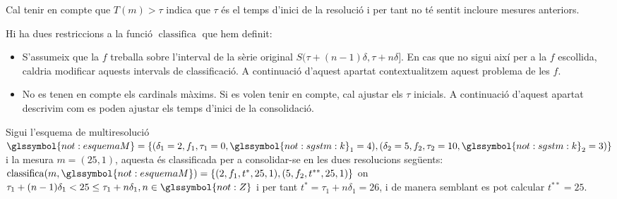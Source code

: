 Cal tenir en compte que $T(m) > \tau$ indica que $\tau$ és el temps
d'inici de la resolució i per tant no té sentit incloure mesures
anteriors.





Hi ha dues restriccions a la funció $\operatorname{classifica}$ que
hem definit: 
\begin{itemize}

\item S'assumeix que la $f$ treballa sobre l'interval de la sèrie
  original $S(\tau+(n-1)\delta ,\tau+n\delta]$. En cas que no sigui
  així per a la $f$ escollida, caldria modificar aquests intervals de
  classificació. A continuació d'aquest apartat contextualitzem aquest
  problema de les $f$.

\item No es tenen en compte els cardinals màxims. Si es volen tenir en
  compte, cal ajustar els $\tau$ inicials. A continuació d'aquest
  apartat descrivim com es poden ajustar els temps d'inici de la
  consolidació.

\end{itemize}



\begin{example}
  \label{ex:mapreduce:classifica}
  Sigui l'esquema de multiresolució
  $\glssymbol{not:esquemaM}=\{(\delta_1=2,f_1,\tau_1=0,
  \glssymbol{not:sgstm:k}_1=4),
  (\delta_2=5,f_2,\tau_2=10,\glssymbol{not:sgstm:k}_2=3)\}$ i la
  mesura $m=(25,1)$, aquesta és classificada per a consolidar-se en
  les dues resolucions següents:
  $\operatorname{classifica}(m,\glssymbol{not:esquemaM})=\{
  (2,f_1,t^*,25,1), (5,f_2,t^{**},25,1) \}$ on $\tau_1+(n-1)\delta_1 <
  25 \leq \tau_1+n\delta_1, n\in\glssymbol{not:Z}$ i per tant
  $t^*=\tau_1+n\delta_1 = 26$, i de manera semblant es pot calcular
  $t^{**}= 25$.
\end{example}



